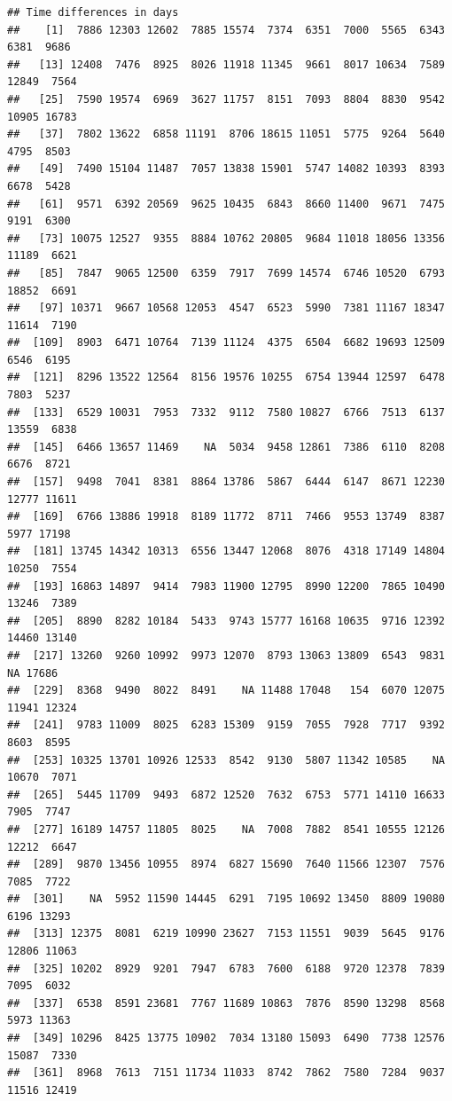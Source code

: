 \documentclass[
]{article}
\begin{document}
\begin{verbatim}
## Time differences in days
##    [1]  7886 12303 12602  7885 15574  7374  6351  7000  5565  6343  6381  9686
##   [13] 12408  7476  8925  8026 11918 11345  9661  8017 10634  7589 12849  7564
##   [25]  7590 19574  6969  3627 11757  8151  7093  8804  8830  9542 10905 16783
##   [37]  7802 13622  6858 11191  8706 18615 11051  5775  9264  5640  4795  8503
##   [49]  7490 15104 11487  7057 13838 15901  5747 14082 10393  8393  6678  5428
##   [61]  9571  6392 20569  9625 10435  6843  8660 11400  9671  7475  9191  6300
##   [73] 10075 12527  9355  8884 10762 20805  9684 11018 18056 13356 11189  6621
##   [85]  7847  9065 12500  6359  7917  7699 14574  6746 10520  6793 18852  6691
##   [97] 10371  9667 10568 12053  4547  6523  5990  7381 11167 18347 11614  7190
##  [109]  8903  6471 10764  7139 11124  4375  6504  6682 19693 12509  6546  6195
##  [121]  8296 13522 12564  8156 19576 10255  6754 13944 12597  6478  7803  5237
##  [133]  6529 10031  7953  7332  9112  7580 10827  6766  7513  6137 13559  6838
##  [145]  6466 13657 11469    NA  5034  9458 12861  7386  6110  8208  6676  8721
##  [157]  9498  7041  8381  8864 13786  5867  6444  6147  8671 12230 12777 11611
##  [169]  6766 13886 19918  8189 11772  8711  7466  9553 13749  8387  5977 17198
##  [181] 13745 14342 10313  6556 13447 12068  8076  4318 17149 14804 10250  7554
##  [193] 16863 14897  9414  7983 11900 12795  8990 12200  7865 10490 13246  7389
##  [205]  8890  8282 10184  5433  9743 15777 16168 10635  9716 12392 14460 13140
##  [217] 13260  9260 10992  9973 12070  8793 13063 13809  6543  9831    NA 17686
##  [229]  8368  9490  8022  8491    NA 11488 17048   154  6070 12075 11941 12324
##  [241]  9783 11009  8025  6283 15309  9159  7055  7928  7717  9392  8603  8595
##  [253] 10325 13701 10926 12533  8542  9130  5807 11342 10585    NA 10670  7071
##  [265]  5445 11709  9493  6872 12520  7632  6753  5771 14110 16633  7905  7747
##  [277] 16189 14757 11805  8025    NA  7008  7882  8541 10555 12126 12212  6647
##  [289]  9870 13456 10955  8974  6827 15690  7640 11566 12307  7576  7085  7722
##  [301]    NA  5952 11590 14445  6291  7195 10692 13450  8809 19080  6196 13293
##  [313] 12375  8081  6219 10990 23627  7153 11551  9039  5645  9176 12806 11063
##  [325] 10202  8929  9201  7947  6783  7600  6188  9720 12378  7839  7095  6032
##  [337]  6538  8591 23681  7767 11689 10863  7876  8590 13298  8568  5973 11363
##  [349] 10296  8425 13775 10902  7034 13180 15093  6490  7738 12576 15087  7330
##  [361]  8968  7613  7151 11734 11033  8742  7862  7580  7284  9037 11516 12419

\end{verbatim}
\end{document}
